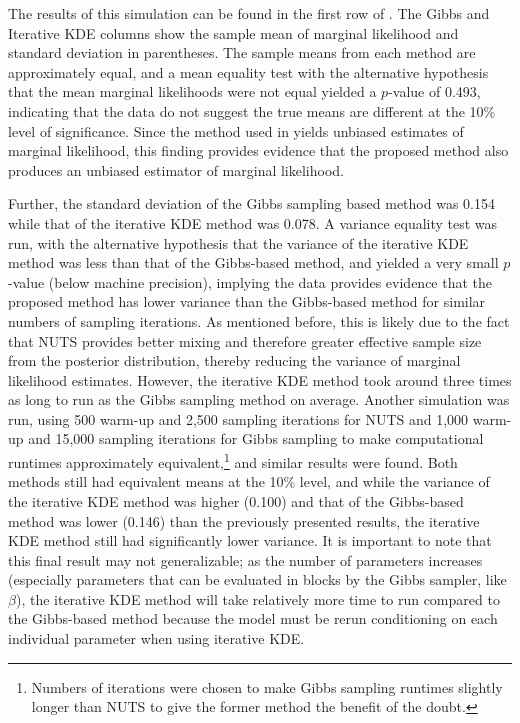 \documentclass[twocolumn]{article}
\begin{document}
The results of this simulation can be found in the first row of . The Gibbs and Iterative KDE columns show the sample mean of marginal likelihood and standard deviation in parentheses. The sample means from each method are approximately equal, and a mean equality test with the alternative hypothesis that the mean marginal likelihoods were not equal yielded a $p$-value of 0.493, indicating that the data do not suggest the true means are different at the 10\% level of significance. Since the method used in \cite{Chib} yields unbiased estimates of marginal likelihood, this finding provides evidence that the proposed method also produces an unbiased estimator of marginal likelihood.

Further, the standard deviation of the Gibbs sampling based method was 0.154 while that of the iterative KDE method was 0.078. A variance equality test was run, with the alternative hypothesis that the variance of the iterative KDE method was less than that of the Gibbs-based method, and yielded a very small $p$-value (below machine precision), implying the data provides evidence that the proposed method has lower variance than the Gibbs-based method for similar numbers of sampling iterations. As mentioned before, this is likely due to the fact that NUTS provides better mixing and therefore greater effective sample size from the posterior distribution, thereby reducing the variance of marginal likelihood estimates. However, the iterative KDE method took around three times as long to run as the Gibbs sampling method on average. Another simulation was run, using 500 warm-up and 2,500 sampling iterations for NUTS and 1,000 warm-up and 15,000 sampling iterations for Gibbs sampling to make computational runtimes approximately equivalent,\footnote{Numbers of iterations were chosen to make Gibbs sampling runtimes slightly longer than NUTS to give the former method the benefit of the doubt.} and similar results were found. Both methods still had equivalent means at the 10\% level, and while the variance of the iterative KDE method was higher (0.100) and that of the Gibbs-based method was lower (0.146) than the previously presented results, the iterative KDE method still had significantly lower variance. It is important to note that this final result may not generalizable; as the number of parameters increases (especially parameters that can be evaluated in blocks by the Gibbs sampler, like $\beta$), the iterative KDE method will take relatively more time to run compared to the Gibbs-based method because the model must be rerun conditioning on each individual parameter when using iterative KDE.
\end{document}
